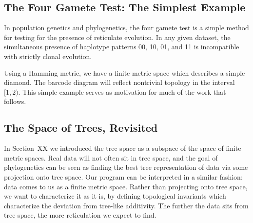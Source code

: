 \subsection{The Four Gamete Test: The Simplest Example}

In population genetics and phylogenetics, the four gamete test is a simple method for testing for the presence of reticulate evolution.
In any given dataset, the simultaneous presence of haplotype patterns 00, 10, 01, and 11 is incompatible with strictly clonal evolution.

Using a Hamming metric, we have a finite metric space which describes a simple diamond.
The barcode diagram will reflect nontrivial topology in the interval $[1,2)$.
This simple example serves as motivation for much of the work that follows.

\subsection{The Space of Trees, Revisited}

In Section~XX we introduced the tree space as a subspace of the space of finite metric spaces.
Real data will not often sit in tree space, and the goal of phylogenetics can be seen as finding the best tree representation of data via some projection onto tree space.
Our program can be interpreted in a similar fashion: data comes to us as a finite metric space.
Rather than projecting onto tree space, we want to characterize it as it is, by defining topological invariants which characterize the deviation from tree-like additivity.
The further the data sits from tree space, the more reticulation we expect to find.